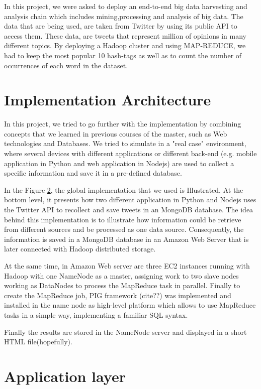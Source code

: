 \documentclass{article}
\begin{document}
        In this project, we were asked to deploy an end-to-end big data harvesting and analysis chain which includes mining,processing and analysis of big data. The data that are being used, are taken from Twitter by using its public API to access them. These data, are tweets that represent million of opinions in many different topics. By deploying a Hadoop cluster and using MAP-REDUCE, we had to keep the most popular 10 hash-tags as well as to count the number of occurrences of each word in the dataset.
         
        \newpage         
        \section{Implementation Architecture}
       In this project, we tried to go further with the implementation by combining concepts that we learned in previous courses of the master, such as Web technologies and Databases.  
        We tried to simulate in a "real case" environment, where several devices with different applications or different back-end (e.g. mobile application in Python and web application in Nodejs) are used to collect a specific information and save it in a pre-defined database.

        In the Figure \ref{}, the global implementation that we used is Illustrated. At the bottom level, it presents how two different application in Python and Nodejs uses the Twitter API to recollect and save tweets in an MongoDB database. The idea behind this implementation is to illustrate how information could be retrieve from different sources and be processed as one data source.
        Consequently, the information is saved in a MongoDB database in an Amazon Web Server that is later connected with Hadoop distributed storage.

        At the same time, in Amazon Web server are three EC2 instances running with Hadoop with one NameNode as a master, assigning work to two slave nodes working as DataNodes to process the MapReduce task in parallel. Finally to create the MapReduce job, PIG framework (cite??) was implemented and installed in the name node as high-level platform which allows to use MapReduce tasks in a simple way, implementing a familiar SQL syntax.

        Finally the results are stored in the NameNode server and displayed in a short HTML file(hopefully).

        
        \section{Application layer}
\end{document}
